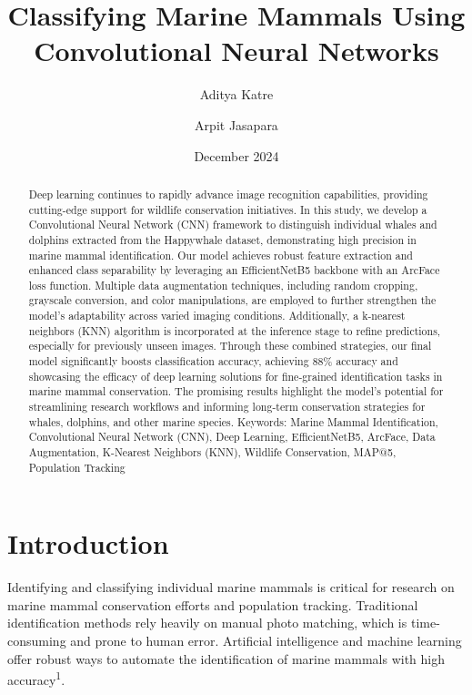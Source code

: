 \documentclass[twocolumn]{article}
\title{Classifying Marine Mammals Using Convolutional Neural Networks}
\author[1]{Aditya Katre}
\author[2]{Arpit Jasapara}
\affil[1]{Del Norte High, San Diego, California}
\affil[2]{University of California Los Angeles, Los Angeles, California}
\begin{document}
\date{December 2024}
\maketitle

\begin{abstract}
Deep learning continues to rapidly advance image recognition capabilities, providing cutting-edge support for wildlife conservation initiatives. In this study, we develop a Convolutional Neural Network (CNN) framework to distinguish individual whales and dolphins extracted from the Happywhale dataset, demonstrating high precision in marine mammal identification. Our model achieves robust feature extraction and enhanced class separability by leveraging an EfficientNetB5 backbone with an ArcFace loss function. Multiple data augmentation techniques, including random cropping, grayscale conversion, and color manipulations, are employed to further strengthen the model’s adaptability across varied imaging conditions. Additionally, a k-nearest neighbors (KNN) algorithm is incorporated at the inference stage to refine predictions, especially for previously unseen images. Through these combined strategies, our final model significantly boosts classification accuracy, achieving 88\% accuracy and showcasing the efficacy of deep learning solutions for fine-grained identification tasks in marine mammal conservation. The promising results highlight the model’s potential for streamlining research workflows and informing long-term conservation strategies for whales, dolphins, and other marine species.
\newline
\newline
Keywords: Marine Mammal Identification, Convolutional Neural Network (CNN), Deep Learning, EfficientNetB5, ArcFace, Data Augmentation, K-Nearest Neighbors (KNN), Wildlife Conservation, MAP@5, Population Tracking
\end{abstract}

\section{Introduction}
Identifying and classifying individual marine mammals is critical for research on marine mammal conservation efforts and population tracking. Traditional identification methods rely heavily on manual photo matching, which is time-consuming and prone to human error. Artificial intelligence and machine learning offer robust ways to automate the identification of marine mammals with high accuracy\textsuperscript{1}.
\end{document}
